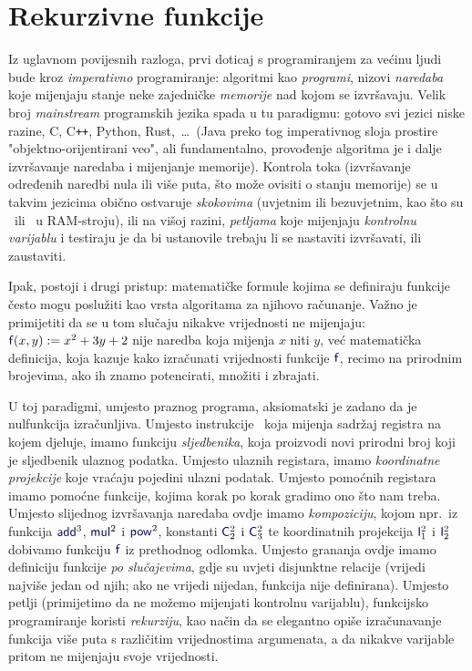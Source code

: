 \chapter{Rekurzivne funkcije}\label{ch:rek}

Iz uglavnom povijesnih razloga, prvi doticaj s programiranjem za većinu ljudi bude kroz \emph{imperativno} programiranje: algoritmi kao \emph{programi}, nizovi \emph{naredaba} koje mijenjaju stanje neke zajedničke \emph{memorije} nad kojom se izvršavaju. Velik broj \emph{mainstream} programskih jezika spada u tu paradigmu: gotovo svi jezici niske razine, C, C\texttt{++}, Python, Rust,~\ldots\ (Java preko tog imperativnog sloja prostire "objektno-orijentirani veo", ali fundamentalno, provođenje algoritma je i dalje izvršavanje naredaba i mijenjanje memorije). Kontrola toka (izvršavanje određenih naredbi nula ili više puta, što može ovisiti o stanju memorije) se u takvim jezicima obično ostvaruje \emph{skokovima} (uvjetnim ili bezuvjetnim, kao što su \dec\ ili \goto\ u RAM-stroju), ili na višoj razini, \emph{petljama} koje mijenjaju \emph{kontrolnu varijablu} i testiraju je da bi ustanovile trebaju li se nastaviti izvršavati, ili zaustaviti.

Ipak, postoji i drugi pristup: matematičke formule kojima se definiraju funkcije često mogu poslužiti kao vrsta algoritama za njihovo računanje. Važno je primijetiti da se u tom slučaju nikakve vrijednosti ne mijenjaju: $\f f(x,y):=x^2+3y+2$ nije naredba koja mijenja $x$ niti $y$, već matematička definicija, koja kazuje kako izračunati vrijednosti funkcije $\f f$, recimo na prirodnim brojevima, ako ih znamo potencirati, množiti i zbrajati.

U toj paradigmi, umjesto praznog programa, aksiomatski je zadano da je nulfunkcija izračunljiva. Umjesto instrukcije \inc\ koja mijenja sadržaj registra na kojem djeluje, imamo funkciju \emph{sljedbenika}, koja proizvodi novi prirodni broj koji je sljedbenik ulaznog podatka. Umjesto ulaznih registara, imamo \emph{koordinatne projekcije} koje vraćaju pojedini ulazni podatak. Umjesto pomoćnih registara imamo pomoćne funkcije, kojima korak po korak gradimo ono što nam treba. Umjesto slijednog izvršavanja naredaba ovdje imamo \emph{kompoziciju}, kojom npr.\ iz funkcija $\f{add}^3$, $\f{mul}^2$ i $\f{pow}^2$, konstanti $\f C_2^2$ i $\f C_3^2$ te koordinatnih projekcija $\f I_1^2$ i $\f I_2^2$ dobivamo funkciju $\f f$ iz prethodnog odlomka. Umjesto grananja ovdje imamo definiciju funkcije \emph{po slučajevima}, gdje su uvjeti disjunktne relacije (vrijedi najviše jedan od njih; ako ne vrijedi nijedan, funkcija nije definirana). Umjesto petlji (primijetimo da ne možemo mijenjati kontrolnu varijablu), funkcijsko programiranje koristi \emph{rekurziju}, kao način da se elegantno opiše izračunavanje funkcija više puta s različitim vrijednostima argumenata, a da nikakve varijable pritom ne mijenjaju svoje vrijednosti. 

